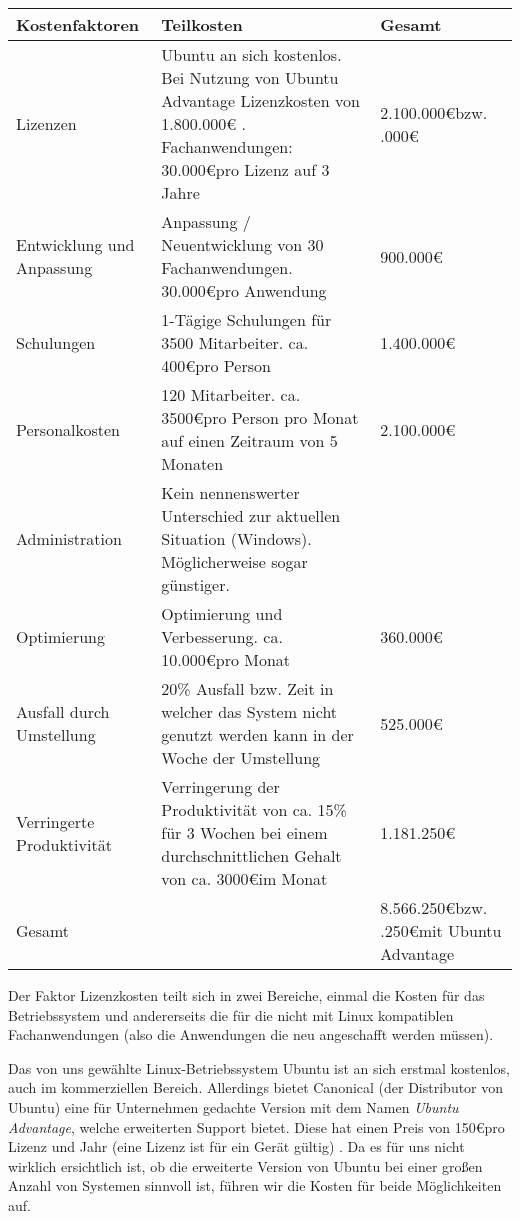 \documentclass[12pt,utf8]{scrartcl}
\begin{document}
\begin{table}[h]
\begin{tabular}{|p{5cm}|p{8cm}|p{2cm}|}
\hline
Kostenfaktoren & Teilkosten & Gesamt \\
\hline
Lizenzen & Ubuntu an sich kostenlos. Bei Nutzung von Ubuntu Advantage Lizenzkosten von 1.800.000\euro \cite{ubuntu} . \newline 70 Fachanwendungen: 30.000\euro \space pro Lizenz auf 3 Jahre & 2.100.000\euro \newline bzw. \newline 3.900.000\euro \\
\hline
Entwicklung und Anpassung & Anpassung / Neuentwicklung von 30 Fachanwendungen. 30.000\euro \space pro Anwendung & 900.000\euro \\
\hline
Schulungen & 1-Tägige Schulungen für 3500 Mitarbeiter. ca. 400\euro \space pro Person \cite{itsch} \cite{protra} & 1.400.000\euro \\
\hline
Personalkosten & 120 Mitarbeiter. ca. 3500\euro \space pro Person pro Monat auf einen Zeitraum von 5 Monaten & 2.100.000\euro \\
\hline
Administration & Kein nennenswerter Unterschied zur aktuellen Situation (Windows). Möglicherweise sogar günstiger. & \\
\hline
Optimierung & Optimierung und Verbesserung. ca. 10.000\euro pro Monat & 360.000\euro \\
\hline
Ausfall durch Umstellung & 20\% Ausfall bzw. Zeit in welcher das System nicht genutzt werden kann in der Woche der Umstellung & 525.000\euro \\
\hline
Verringerte Produktivität & Verringerung der Produktivität von ca. 15\% für 3 Wochen bei einem durchschnittlichen Gehalt von ca. 3000\euro \space im Monat & 1.181.250\euro \\
\hline
Gesamt & & 8.566.250\euro \newline bzw. \newline 10.366.250\euro \space mit Ubuntu Advantage \\
\hline
\end{tabular}
\end{table}

Der Faktor Lizenzkosten teilt sich in zwei Bereiche, einmal die Kosten für das Betriebssystem und andererseits die für die nicht mit Linux kompatiblen Fachanwendungen (also die Anwendungen die neu angeschafft werden müssen).

Das von uns gewählte Linux-Betriebssystem Ubuntu ist an sich erstmal kostenlos, auch im kommerziellen Bereich. Allerdings bietet Canonical (der Distributor von Ubuntu) eine für Unternehmen gedachte Version mit dem Namen \emph{Ubuntu Advantage}, welche erweiterten Support bietet. Diese hat einen Preis von 150\euro \space pro Lizenz und Jahr (eine Lizenz ist für ein Gerät gültig) \cite{ubuntu}. Da es für uns nicht wirklich ersichtlich ist, ob die erweiterte Version von Ubuntu bei einer großen Anzahl von Systemen sinnvoll ist, führen wir die Kosten für beide Möglichkeiten auf.
\end{document}
